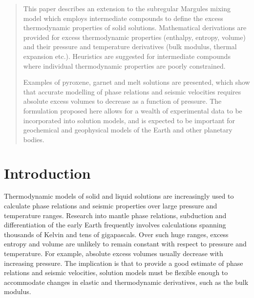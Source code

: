 \date{Received: date / Accepted: date}


\maketitle

\begin{abstract}


This paper describes an extension to the subregular Margules mixing model which employs intermediate compounds to define the excess thermodynamic properties of solid solutions. Mathematical derivations are provided for excess thermodynamic properties (enthalpy, entropy, volume) and their pressure and temperature derivatives (bulk modulus, thermal expansion etc.). Heuristics are suggested for intermediate compounds where individual thermodynamic properties are poorly constrained.

Examples of pyroxene, garnet and melt solutions are presented, which show that accurate modelling of phase relations and seismic velocities requires absolute excess volumes to decrease as a function of pressure. The formulation proposed here allows for a wealth of experimental data to be incorporated into solution models, and is expected to be important for geochemical and geophysical models of the Earth and other planetary bodies.

\end{abstract}



\section{Introduction}
Thermodynamic models of solid and liquid solutions are increasingly used to calculate phase relations and seismic properties over large pressure and temperature ranges. Research into mantle phase relations, subduction and differentiation of the early Earth frequently involves calculations spanning thousands of Kelvin and tens of gigapascals. Over such huge ranges, excess entropy and volume are unlikely to remain constant with respect to pressure and temperature. For example, absolute excess volumes usually decrease with increasing pressure. The implication is that to provide a good estimate of phase relations and seismic velocities, solution models must be flexible enough to accommodate changes in elastic and thermodynamic derivatives, such as the bulk modulus.

